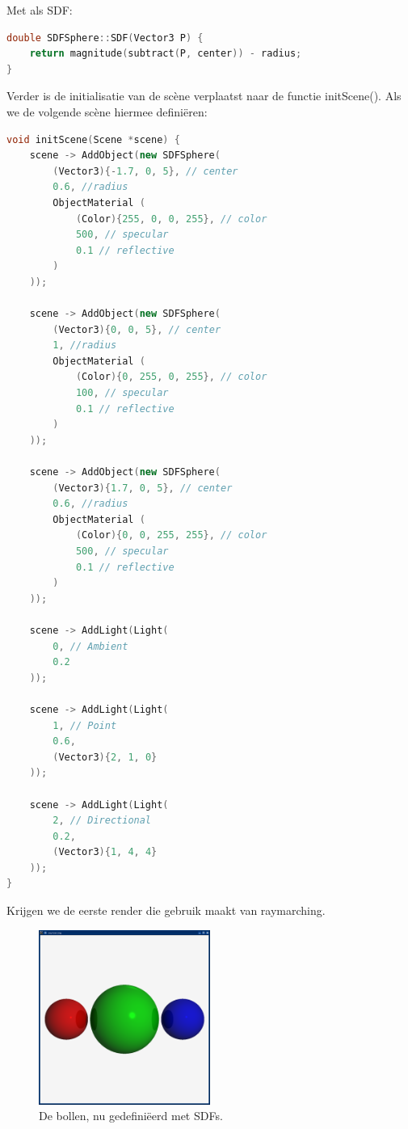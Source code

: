 \documentclass[12pt, a4paper]{article}
\begin{document}
Met als SDF:

\begin{lstlisting}[language=C++]
double SDFSphere::SDF(Vector3 P) {
    return magnitude(subtract(P, center)) - radius;
}
\end{lstlisting}

Verder is de initialisatie van de scène verplaatst naar de functie initScene(). Als we de volgende scène hiermee definiëren:
\begin{lstlisting}[language=C++]
void initScene(Scene *scene) {
    scene -> AddObject(new SDFSphere(
        (Vector3){-1.7, 0, 5}, // center
        0.6, //radius
        ObjectMaterial (
            (Color){255, 0, 0, 255}, // color
            500, // specular
            0.1 // reflective
        )
    ));

    scene -> AddObject(new SDFSphere(
        (Vector3){0, 0, 5}, // center
        1, //radius
        ObjectMaterial (
            (Color){0, 255, 0, 255}, // color
            100, // specular
            0.1 // reflective
        )
    ));

    scene -> AddObject(new SDFSphere(
        (Vector3){1.7, 0, 5}, // center
        0.6, //radius
        ObjectMaterial (
            (Color){0, 0, 255, 255}, // color
            500, // specular
            0.1 // reflective
        )
    ));

    scene -> AddLight(Light(
        0, // Ambient
        0.2
    ));

    scene -> AddLight(Light(
        1, // Point
        0.6,
        (Vector3){2, 1, 0}
    ));

    scene -> AddLight(Light(
        2, // Directional
        0.2,
        (Vector3){1, 4, 4}
    ));
}
\end{lstlisting}

Krijgen we de eerste render die gebruik maakt van raymarching.

\begin{figure}[H]
    \centering
    \includegraphics[width=0.50\textwidth]{renders/first_raymarched.png}
    \caption{De bollen, nu gedefiniëerd met SDFs.}
    \label{fig:first_raymarched}
\end{figure}
\end{document}
